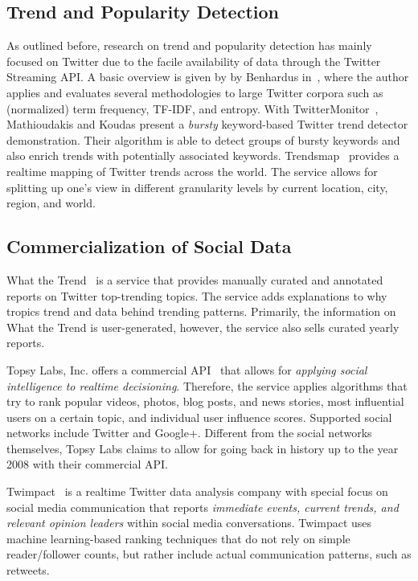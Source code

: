\documentclass{iosart2c}
\begin{document}
\subsection{Trend and Popularity Detection}
As outlined before, research on trend and popularity detection has mainly focused on Twitter due to the facile availability of data through the Twitter Streaming API.
A basic overview is given by by Benhardus in~\cite{benhardus2010streaming}, where the author applies and evaluates several methodologies to large Twitter corpora such as (normalized) term frequency, TF-IDF, and entropy.
With TwitterMonitor~\cite{Mathioudakis:2010:TTD:1807167.1807306}, Mathioudakis and Koudas present a \textit{bursty} keyword-based Twitter trend detector demonstration.
Their algorithm is able to detect groups of bursty keywords and also enrich trends with potentially associated keywords.
Trendsmap~\cite{trendsmap} provides a realtime mapping of Twitter trends across the world.
The service allows for splitting up one's view in different granularity levels by current location, city, region, and world.

\subsection{Commercialization of Social Data}
What the Trend~\cite{whatthetrend} is a service that provides manually curated and annotated reports on Twitter top-trending topics.
The service adds explanations to why tropics trend and data behind trending patterns.
Primarily, the information on What the Trend is user-generated, however, the service also sells curated yearly reports.

Topsy Labs, Inc. offers a commercial API~\cite{topsy} that allows for \textit{applying social intelligence to realtime decisioning}.
Therefore, the service applies algorithms that try to rank popular videos, photos, blog posts, and news stories, most influential users on a certain topic, and individual user influence scores.
Supported social networks include Twitter and Google+.
Different from the social networks themselves, Topsy Labs claims to allow for going back in history up to the year 2008 with their commercial API.

Twimpact~\cite{twimpact} is a realtime Twitter data analysis company with special focus on social media communication that reports \textit{immediate events, current trends, and relevant opinion leaders} within social media conversations.
Twimpact uses machine learning-based ranking techniques that do not rely on simple reader/follower counts, but rather include actual communication patterns, such as retweets. 
\end{document}
